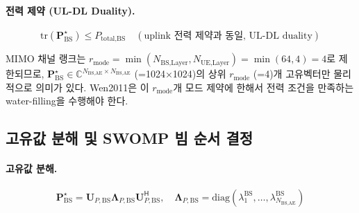 \documentclass[10pt]{article}
\begin{document}
\paragraph{전력 제약 (UL-DL Duality).}
\begin{equation}
\text{tr}(\mathbf{P}_{\text{BS}}^{\star}) \leq P_{\text{total,BS}} \quad (\text{uplink 전력 제약과 동일, UL-DL duality})
\end{equation}

MIMO 채널 랭크는 $r_{\text{mode}} = \min(N_{\text{BS,Layer}}, N_{\text{UE,Layer}}) = \min(64, 4) = 4$로 제한되므로, $\mathbf{P}_{\text{BS}}^{\star} \in \mathbb{C}^{N_{\text{BS,AE}} \times N_{\text{BS,AE}}}$ (=1024×1024)의 상위 $r_{\text{mode}}$ (=4)개 고유벡터만 물리적으로 의미가 있다. Wen2011은 이 $r_{\text{mode}}$개 모드 제약에 한해서 전력 조건을 만족하는 water-filling을 수행해야 한다.

\subsection{고유값 분해 및 SWOMP 빔 순서 결정}

\paragraph{고유값 분해.}
\begin{equation}
\mathbf{P}_{\text{BS}}^{\star} = \mathbf{U}_{P,\text{BS}} \boldsymbol{\Lambda}_{P,\text{BS}} \mathbf{U}_{P,\text{BS}}^{\mathsf{H}}, \quad \boldsymbol{\Lambda}_{P,\text{BS}} = \text{diag}(\lambda_1^{\text{BS}}, \ldots, \lambda_{N_{\text{BS,AE}}}^{\text{BS}})
\end{equation}
\end{document}
